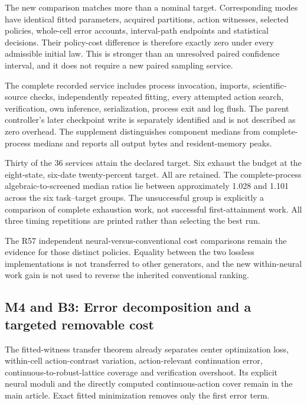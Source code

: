 The new comparison matches more than a nominal target. Corresponding
modes have identical fitted parameters, acquired partitions, action
witnesses, selected policies, whole-cell error accounts, interval-path
endpoints and statistical decisions. Their policy-cost difference is
therefore exactly zero under every admissible initial law. This is
stronger than an unresolved paired confidence interval, and it does not
require a new paired sampling service.

The complete recorded service includes process invocation, imports,
scientific-source checks, independently repeated fitting, every
attempted action search, verification, own inference, serialization,
process exit and log flush. The parent controller's later checkpoint
write is separately identified and is not described as zero overhead.
The supplement distinguishes component medians from complete-process
medians and reports all output bytes and resident-memory peaks.

Thirty of the 36 services attain the declared target. Six exhaust the
budget at the eight-state, six-date twenty-percent target. All are
retained. The complete-process algebraic-to-screened median ratios lie
between approximately 1.028 and 1.101 across the six task--target
groups. The unsuccessful group is explicitly a comparison of complete
exhaustion work, not successful first-attainment work. All three timing
repetitions are printed rather than selecting the best run.

The R57 independent neural-versus-conventional cost comparisons remain
the evidence for those distinct policies. Equality between the two
lossless implementations is not transferred to other generators, and the
new within-neural work gain is not used to reverse the inherited
conventional ranking.

\hypertarget{m4-and-b3-error-decomposition-and-a-targeted-removable-cost}{%
\subsection{M4 and B3: Error decomposition and a targeted removable
cost}\label{m4-and-b3-error-decomposition-and-a-targeted-removable-cost}}

The fitted-witness transfer theorem already separates center
optimization loss, within-cell action-contrast variation,
action-relevant continuation error, continuous-to-robust-lattice
coverage and verification overshoot. Its explicit neural moduli and the
directly computed continuous-action cover remain in the main article.
Exact fitted minimization removes only the first error term.

